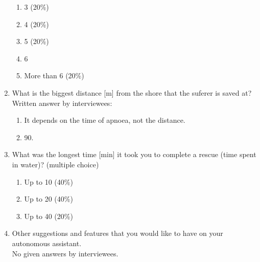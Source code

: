 \begin{enumerate}
\begin{enumerate}
        \item   3 (20\%)
        \item   4 (20\%)
        \item   5 (20\%)
        \item   6
        \item   More than 6 (20\%)
    \end{enumerate}
    \item What is the biggest distance [m] from the shore that the suferer is saved at?\\
            Written answer by interviewees:
            \begin{enumerate}
                \item It depends on the time of apnoea, not the distance.
                \item 90.
            \end{enumerate} 
    \item What was the longest time [min] it took you to complete a rescue (time spent in water)? (multiple choice)
    \begin{enumerate}
        \item  Up to 10 (40\%)
        \item  Up to 20 (40\%)
        \item  Up to 40 (20\%)
    \end{enumerate}
    \item Other suggestions and features that you would like to have on your autonomous assistant.\\
           No given answers by interviewees.     
\end{enumerate}

